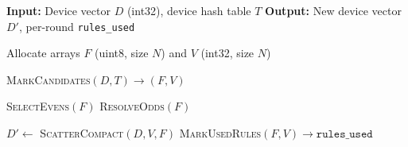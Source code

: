 \begin{algorithm}[t]
  \caption{GPU Parallel Checkerboard Encoding}
  \label{alg:gpu-encoding}
  \begin{algorithmic}[1]
    \STATE \textbf{Input:} Device vector $D$ (int32), device hash table $T$
    \STATE \textbf{Output:} New device vector $D'$, per-round \texttt{rules\_used}

    \STATE Allocate arrays $F$ (uint8, size $N$) and $V$ (int32, size $N$)
    \STATE {}

    \STATE {}
    \STATE \textsc{MarkCandidates}$(D,T)\rightarrow(F,V)$
    \STATE {}

    \STATE {}
    \STATE \textsc{SelectEvens}$(F)$ 
    \STATE \textsc{ResolveOdds}$(F)$ 

    \STATE {}
    \STATE $D' \gets$ \textsc{ScatterCompact}$(D,V,F)$ 
    \STATE \textsc{MarkUsedRules}$(F,V)\rightarrow\texttt{rules\_used}$
  \end{algorithmic}
\end{algorithm}



